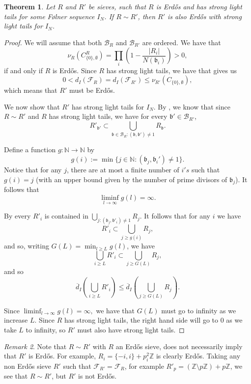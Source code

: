 \documentclass[a4paper,11pt,reqno]{amsart}
\theoremstyle{plain}
\newtheorem{theorem}{Theorem}[section]
\theoremstyle{remark}
\newtheorem{remark}[theorem]{Remark}
\newcommand{\z}{\mathbb{Z}}
\newcommand{\cb}{\mathcal{B}}
\newcommand{\fr}{\mathcal{F}_R}
\newcommand{\frp}{\mathcal{F}_{R'}}
\newcommand{\gb}{\mathfrak{b}}
\begin{document}
		\begin{theorem}
			\label{thm: Strong light tails preserved under isomorphism of sieves}
			Let $R$ and $R'$ be sieves, such that $R$ is Erdős and has strong light tails for some Følner sequence $I_N$. If $R \sim R'$, then $R'$ is also Erdős with strong light tails for $I_N$. 
		\end{theorem}
		
		\begin{proof}
			We will assume that both $\cb_R$ and $\cb_{R'}$ are ordered. We have that $$\nu_{R}(C^R_{\{0\}, \emptyset}) = \prod_{i}\left(1-\frac{|R_i|}{N(\gb_i)}\right) >0,$$ if and only if $R$ is Erdős. Since $R$ has strong light tails, we have that  gives us $$0 <d_I(\fr) = d_I(\frp) \leq \nu_{R'}(C_{\{0\}, \emptyset}),$$ which means that $R'$ must be Erdős. 
			
			We now show that $R'$ has strong light tails for $I_N$. By  , we know that since $R \sim R'$ and $R$ has strong light tails, we have for every $\gb' \in \cb_{R'}$,
			\begin{equation}
				\label{eq: aux bp in b}
				R'_{\gb'} \subset \bigcup_{\gb \in \cb_R:(\gb,\gb') \neq 1} R_{\gb}.
			\end{equation} $$$$ 
			
			Define a function $g:\mathbb{N}\rightarrow\mathbb{N}$ by $$g(i):= \min \{j \in \mathbb{N}: (\gb_j,\gb_i') \neq 1\}.$$ Notice that for any $j$, there are at most a finite number of $i's$ such that $g(i) = j$ (with an upper bound given by the number of prime divisors of $\gb_j$). It follows that $$\liminf_{l \rightarrow \infty} g(l) = \infty.$$ 
			
			By  every $R'_i$ is contained in $\bigcup_{j: (\gb_j,\gb'_i) \neq 1} R_j.$ It follows that for any $i$ we have  $$R'_i \subset \bigcup_{j \geq g(i)} R_{j},$$ and so, writing $G(L) = \min_{l \geq L}g(l)$, we have $$\bigcup_{i \geq L} R'_i \subset \bigcup_{j \geq G(L)} R_{j},$$ and so 			
			$$\overline{d}_I\left(\bigcup_{i \geq L} R'_i\right) \leq \overline{d}_I\left(\bigcup_{j \geq G(L)} R_{j}\right). $$
			
			Since $\liminf_{l \rightarrow \infty} g(l) = \infty,$ we have that $G(L)$ must go to infinity as we increase $L$. Since $R$ has strong light tails, the right hand side will go to $0$ as we take $L$ to infinity, so $R'$ must also have strong light tails.
		\end{proof}
		
		\begin{remark}
			Note that $R \sim R'$ with $R$ an Erdős sieve, does not necessarily imply that $R'$ is Erdős.  For example, $R_i = \{-i,i\} + p_i^2 \z$ is clearly Erdős. Taking any non Erdős sieve $R'$ such that $\frp = \fr$, for example $R'_p = (\z\setminus p\z)  + p\z$, we see that $R \sim R'$, but $R'$ is not Erdős. 
		\end{remark}
		
\end{document}
